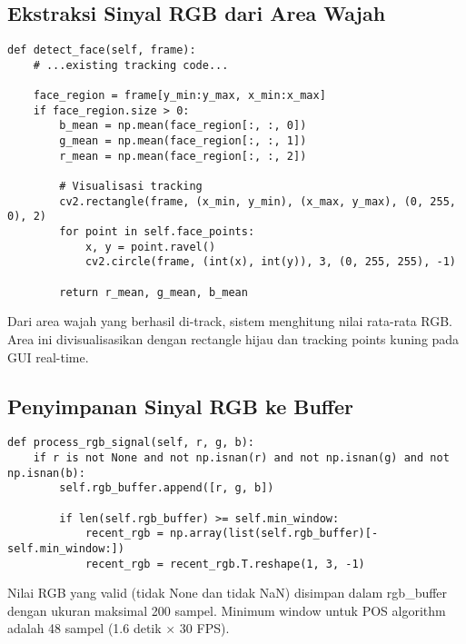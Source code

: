 \documentclass[11pt,a4paper]{article}
\begin{document}
\subsection{Ekstraksi Sinyal RGB dari Area Wajah}
    \begin{lstlisting}
def detect_face(self, frame):
    # ...existing tracking code...
    
    face_region = frame[y_min:y_max, x_min:x_max]
    if face_region.size > 0:
        b_mean = np.mean(face_region[:, :, 0])
        g_mean = np.mean(face_region[:, :, 1])
        r_mean = np.mean(face_region[:, :, 2])
        
        # Visualisasi tracking
        cv2.rectangle(frame, (x_min, y_min), (x_max, y_max), (0, 255, 0), 2)
        for point in self.face_points:
            x, y = point.ravel()
            cv2.circle(frame, (int(x), int(y)), 3, (0, 255, 255), -1)
            
        return r_mean, g_mean, b_mean
    \end{lstlisting}
    Dari area wajah yang berhasil di-track, sistem menghitung nilai rata-rata RGB. Area ini divisualisasikan dengan rectangle hijau dan tracking points kuning pada GUI real-time.

\subsection{Penyimpanan Sinyal RGB ke Buffer}
    \begin{lstlisting}
def process_rgb_signal(self, r, g, b):
    if r is not None and not np.isnan(r) and not np.isnan(g) and not np.isnan(b):
        self.rgb_buffer.append([r, g, b])
        
        if len(self.rgb_buffer) >= self.min_window:
            recent_rgb = np.array(list(self.rgb_buffer)[-self.min_window:])
            recent_rgb = recent_rgb.T.reshape(1, 3, -1)
    \end{lstlisting}
    Nilai RGB yang valid (tidak None dan tidak NaN) disimpan dalam rgb\_buffer dengan ukuran maksimal 200 sampel. Minimum window untuk POS algorithm adalah 48 sampel (1.6 detik × 30 FPS).
\end{document}
